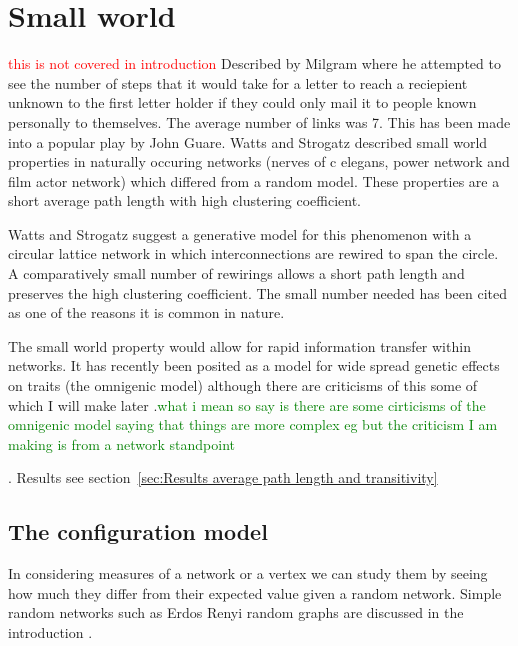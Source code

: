 
\section{Small world}
\label{sec:Small world}
\textcolor{red}{this is not covered in introduction}
Described by Milgram \cite{milgram1967small} where he attempted to see the number of steps that it would take for a letter to reach a reciepient unknown to the first letter holder if they could only mail it to people known personally to themselves. The average number of links was 7. This has been made into a popular play by John Guare. Watts and Strogatz \cite{watts1998collective} described small world properties in naturally occuring networks (nerves of c elegans, power network and film actor network) which differed from a random model. These properties are a short average path length with high clustering coefficient. 

Watts and Strogatz \cite{watts1998collective} suggest a generative model for this phenomenon with a circular lattice network in which interconnections are rewired to span the circle. A comparatively small number of rewirings allows a short path length and preserves the high clustering coefficient. The small number needed has been cited as one of the reasons it is common in nature. 

The small world property would allow for rapid information transfer within networks. It has recently been posited as a model for wide spread genetic effects on traits (the omnigenic model) \cite{boyle2017expanded} although there are criticisms of this some of which I will make later .\textcolor{green}{what i mean so say is there are some cirticisms of the omnigenic model saying that things are more complex eg \cite{wray2018common} \cite{boyle2017omnigenic_response}  but the criticism I am making is from a network standpoint} 


. Results see section~\ref{sec:Results average path length and transitivity}

\subsection{The configuration model}
\label{sec:configuration model}
In considering measures of  a network or a vertex we can study them by seeing how much they differ from their expected value given a random network. Simple random networks such as Erdos Renyi random graphs are discussed in the introduction .

